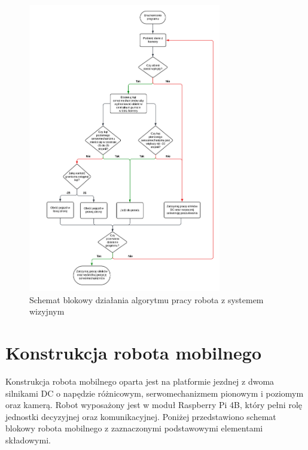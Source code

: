 \documentclass[a4paper,twoside,12pt]{book}
\begin{document}
\begin{figure}[h]
    \centering
    \includegraphics[width=0.75\textwidth]{Images/Schemat blokowy/Engineering Thesis.png}
    \caption{Schemat blokowy działania algorytmu pracy robota z systemem wizyjnym}
    \label{fig:Schemat blokowy}
\end{figure}

\newpage
\section{Konstrukcja robota mobilnego}
Konstrukcja robota mobilnego oparta jest na platformie jezdnej z dwoma silnikami DC o napędzie różnicowym, serwomechanizmem pionowym i poziomym oraz kamerą. Robot wyposażony jest w moduł Raspberry Pi 4B, który pełni rolę jednostki decyzyjnej oraz komunikacyjnej. Poniżej przedstawiono schemat blokowy robota mobilnego z zaznaczonymi podstawowymi elementami składowymi.
\end{document}
